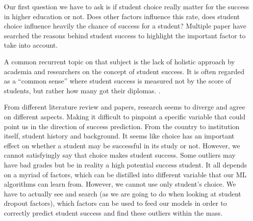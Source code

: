 \documentclass[../../main.tex]{subfiles}
\begin{document}
Our first question we have to ask is if student choice really matter for the success in higher education or not. Does other factors influence this rate, does student choice influence heavily the chance of success for a student?
Multiple paper have searched the reasons behind student success to highlight the important factor to take into account.

A common recurrent topic on that subject is the lack of holistic approach by academia and researchers on the concept of student success. It is often regarded as a “common sense” where student success is measured not by the score of students, but rather how many got their diplomas. \cite{weatherton_success_2021}.

From different literature review and papers, research seems to diverge and agree on different aspects. Making it difficult to pinpoint a specific variable that could point us in the direction of success prediction. From the country to institution itself, student history and background. It seems like choice has an important effect on whether a student may be successful in its study or not. However, we cannot satisfyingly say that choice makes student success.  Some outliers may have bad grades but be in reality a high potential success student. It all depends on a myriad of factors, which can be distilled into different variable that our ML algorithms can learn from. However, we cannot use only student's choice. We have to actually see and search (as we are going to do when looking at student dropout factors), which factors can be used to feed our models in order to correctly predict student success and find these outliers within the mass.\cite{kuh_what_2006, sa_how_2018}
\end{document}
